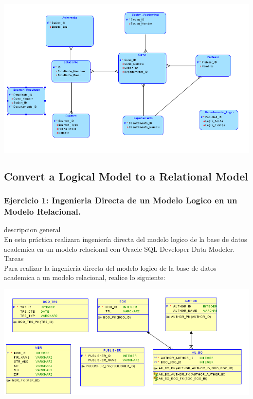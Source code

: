 \documentclass[12pt,letterpaper]{article}
\begin{document}
\begin{center}
    \includegraphics[width=16cm]{./IMAGENES/bd222222222222222222222.png} 
\end{center}




 \newpage
\subsection{Convert a Logical Model to a Relational Model}
 \newpage
\subsubsection{Ejercicio 1: Ingenieria Directa de un Modelo Logico en un Modelo Relacional.} 
descripcion general  \\
En esta práctica realizara ingeniería directa del modelo logico de la base de datos academica en un modelo relacional con Oracle SQL Developer Data Modeler. \\

Tareas\\
Para realizar la ingeniería directa del modelo logico de la base de datos academica a un modelo relacional, realice lo siguiente:

\includegraphics[width=15cm]{./soniaImagen/diagrama1.png} 
\end{document}
